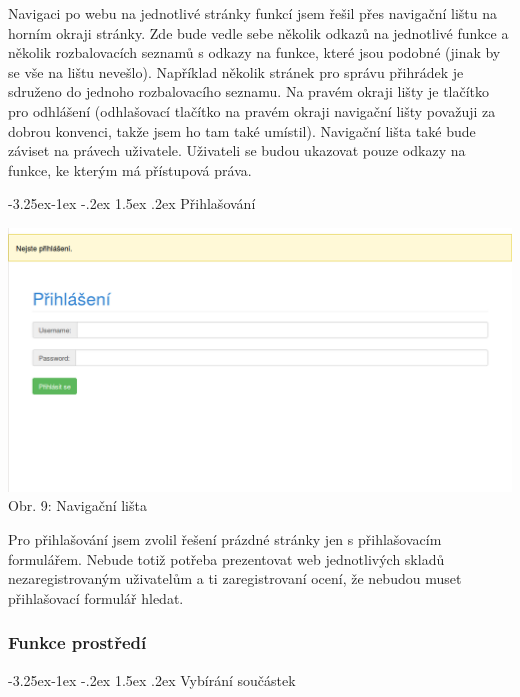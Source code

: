 \documentclass[12pt, a4paper, oneside]{article}
\makeatletter
\renewcommand\paragraph{\@startsection{paragraph}{4}{\z@}%
      {-3.25ex\@plus -1ex \@minus -.2ex}%
      {1.5ex \@plus .2ex}%
      {\normalfont\normalsize\bfseries}}
\makeatother
\begin{document}
Navigaci po webu na jednotlivé stránky funkcí jsem řešil přes navigační lištu na horním okraji stránky. Zde bude vedle sebe několik odkazů na jednotlivé funkce a několik rozbalovacích seznamů s odkazy na funkce, které jsou podobné (jinak by se vše na lištu nevešlo).
Například několik stránek pro správu přihrádek je sdruženo do jednoho rozbalovacího seznamu. Na pravém okraji lišty je tlačítko pro odhlášení (odhlašovací tlačítko na pravém okraji navigační lišty považuji za dobrou konvenci, takže jsem ho tam také umístil).
Navigační lišta také bude záviset na právech uživatele. Uživateli se budou ukazovat pouze odkazy na funkce, ke kterým má přístupová práva.


\paragraph{Přihlašování}

\mbox{}
\begin{minipage}{\textwidth}
\begin{center}
\includegraphics[scale=0.5]{img/web_prihlaseni.png}
\\
\caption{Obr. 9: Navigační lišta}
\end{center}
\end{minipage}
\vspace{4mm}

Pro přihlašování jsem zvolil řešení prázdné stránky jen s přihlašovacím formulářem. Nebude totiž potřeba prezentovat web jednotlivých skladů nezaregistrovaným uživatelům a ti zaregistrovaní ocení, že nebudou muset přihlašovací formulář hledat.

\subsubsection{Funkce prostředí}

\paragraph{Vybírání součástek}
\end{document}
